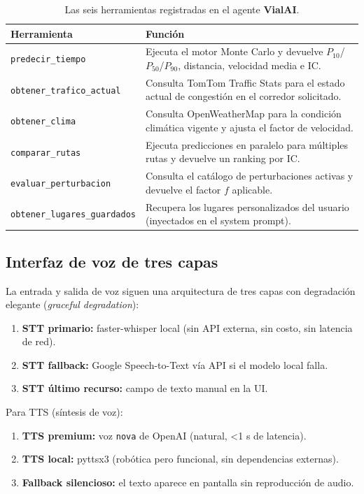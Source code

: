 \documentclass[11pt,a4paper]{article}
\newcommand{\VialAI}{\textbf{\textcolor{vialTeal}{Vial}\textcolor{vialAmber}{AI}}}
\begin{document}
\begin{table}[H]
\centering
\small
\renewcommand{\arraystretch}{1.4}
\begin{tabularx}{\linewidth}{@{}l X@{}}
\toprule
\rowcolor{vialNavy!10}
\textbf{Herramienta} & \textbf{Función} \\
\midrule
\texttt{predecir\_tiempo} & Ejecuta el motor Monte Carlo y devuelve
  $P_{10}$/$P_{50}$/$P_{90}$, distancia, velocidad media e IC. \\
\texttt{obtener\_trafico\_actual} & Consulta TomTom Traffic Stats para el
  estado actual de congestión en el corredor solicitado. \\
\texttt{obtener\_clima} & Consulta OpenWeatherMap para la condición
  climática vigente y ajusta el factor de velocidad. \\
\texttt{comparar\_rutas} & Ejecuta predicciones en paralelo para
  múltiples rutas y devuelve un ranking por IC. \\
\texttt{evaluar\_perturbacion} & Consulta el catálogo de perturbaciones
  activas y devuelve el factor $f$ aplicable. \\
\texttt{obtener\_lugares\_guardados} & Recupera los lugares personalizados
  del usuario (inyectados en el system prompt). \\
\bottomrule
\end{tabularx}
\caption{Las seis herramientas registradas en el agente \VialAI.}
\label{tab:herramientas}
\end{table}

\subsection{Interfaz de voz de tres capas}

La entrada y salida de voz siguen una arquitectura de tres capas con
degradación elegante (\emph{graceful degradation}):

\begin{enumerate}
\item \textbf{STT primario:} faster-whisper local (sin API externa,
sin costo, sin latencia de red).
\item \textbf{STT fallback:} Google Speech-to-Text vía API si el
modelo local falla.
\item \textbf{STT último recurso:} campo de texto manual en la UI.
\end{enumerate}

Para TTS (síntesis de voz):
\begin{enumerate}
\item \textbf{TTS premium:} voz \texttt{nova} de OpenAI (natural,
\textless 1 s de latencia).
\item \textbf{TTS local:} pyttsx3 (robótica pero funcional, sin
dependencias externas).
\item \textbf{Fallback silencioso:} el texto aparece en pantalla sin
reproducción de audio.
\end{enumerate}
\end{document}
